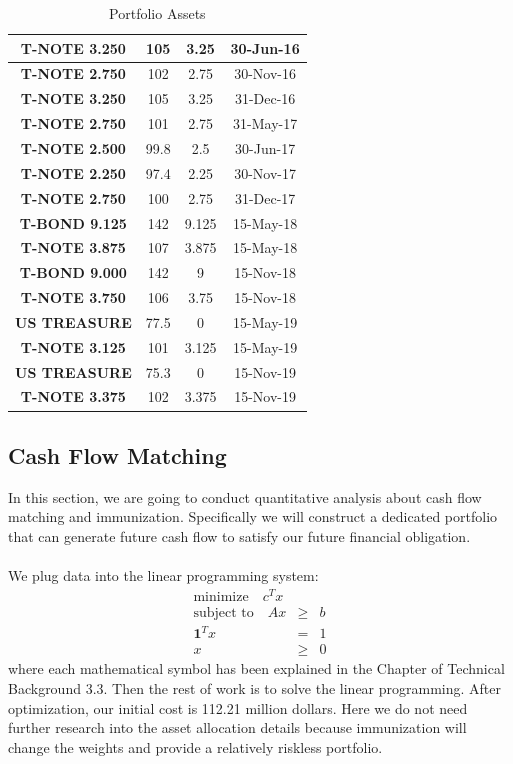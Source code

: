 \documentclass[oneside,12pt]{report}
\begin{document}
{\begin{table}[h]
\begin{tabular}{|c|c|c|c|}
    \textbf{T-NOTE 3.250} & 105   & 3.25  & 30-Jun-16 \\\hline
    \textbf{T-NOTE 2.750} & 102   & 2.75  & 30-Nov-16 \\\hline
    \textbf{T-NOTE 3.250} & 105   & 3.25  & 31-Dec-16 \\\hline
    \textbf{T-NOTE 2.750} & 101   & 2.75  & 31-May-17 \\\hline
    \textbf{T-NOTE 2.500} & 99.8  & 2.5   & 30-Jun-17 \\\hline
    \textbf{T-NOTE 2.250} & 97.4  & 2.25  & 30-Nov-17 \\\hline
    \textbf{T-NOTE 2.750} & 100   & 2.75  & 31-Dec-17 \\\hline
    \textbf{T-BOND 9.125} & 142   & 9.125 & 15-May-18 \\\hline
    \textbf{T-NOTE 3.875} & 107   & 3.875 & 15-May-18 \\\hline
    \textbf{T-BOND 9.000} & 142   & 9     & 15-Nov-18 \\\hline
    \textbf{T-NOTE 3.750} & 106   & 3.75  & 15-Nov-18 \\\hline
    \textbf{US TREASURE} & 77.5  & 0     & 15-May-19 \\\hline
    \textbf{T-NOTE 3.125} & 101   & 3.125 & 15-May-19 \\\hline
    \textbf{US TREASURE} & 75.3  & 0     & 15-Nov-19 \\\hline
    \textbf{T-NOTE 3.375} & 102   & 3.375 & 15-Nov-19 \\\hline
    \end{tabular}
  \caption{Portfolio Assets}
  \label{tab:tnote}
\end{table}


\subsection{Cash Flow Matching}


In this section, we are going to conduct quantitative analysis about cash flow matching and immunization. Specifically we will construct a dedicated portfolio that can generate future cash flow to satisfy our future financial obligation.\\
\\
We plug data into the linear programming system:
\begin{eqnarray*}
\textrm{minimize}\quad    c^T x &   &    \\
\textrm{subject to}\quad  Ax    & \geq& b   \\
                  \mathbf{1}^T x & = & 1\\
                     x     & \geq &0
\end{eqnarray*} where each mathematical symbol has been explained in the Chapter of Technical Background 3.3.
Then the rest of work is to solve the linear programming. After optimization, our initial cost is 112.21 million dollars. Here we do not need further research into the asset allocation details because immunization will change the weights and provide a relatively riskless portfolio.

}
\end{document}
